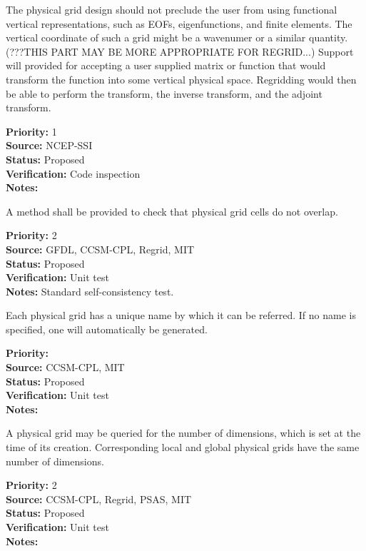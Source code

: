 The physical grid design should not preclude the user from using 
functional vertical representations, such as EOFs, eigenfunctions,
and finite elements.  The vertical coordinate of such a grid might be a wavenumer
or a similar quantity.
(???THIS PART MAY BE MORE APPROPRIATE FOR REGRID...) Support will provided for
accepting a user supplied matrix or function that would transform the function into some
vertical physical space. Regridding would then be able to perform the transform, the
inverse transform, and the adjoint transform.
\begin{reqlist}
{\bf Priority:} 1 \\
{\bf Source:} NCEP-SSI \\
{\bf Status:} Proposed \\
{\bf Verification:} Code inspection \\
{\bf Notes:} 
\end{reqlist}

A method shall be provided to check that physical grid cells do not overlap. 
\begin{reqlist}
{\bf Priority:} 2 \\
{\bf Source:} GFDL, CCSM-CPL, Regrid, MIT \\
{\bf Status:} Proposed \\
{\bf Verification:} Unit test\\
{\bf Notes:} Standard self-consistency test.
\end{reqlist}


Each physical grid has a unique name by which it can be referred.  If no name is
specified, one will automatically be generated.
\begin{reqlist}
{\bf Priority:} \\
{\bf Source:} CCSM-CPL, MIT \\
{\bf Status:} Proposed \\
{\bf Verification:} Unit test \\
{\bf Notes:} 
\end{reqlist}

A physical grid may be queried for the number of dimensions, which is
set at the time of its creation.  Corresponding local and global physical grids have
the same number of dimensions.
\begin{reqlist}
{\bf Priority:} 2 \\
{\bf Source:} CCSM-CPL, Regrid, 
PSAS, MIT  \\
{\bf Status:} Proposed \\
{\bf Verification:} Unit test \\
{\bf Notes:} 
\end{reqlist}

